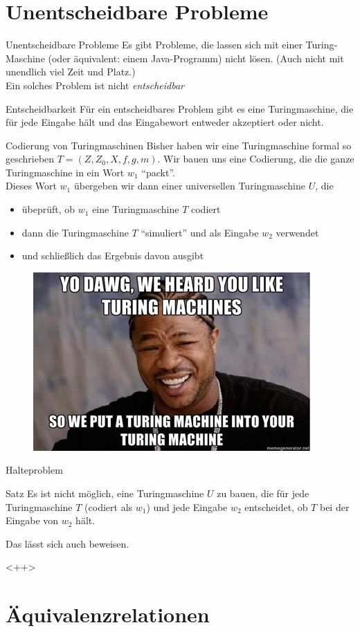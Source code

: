 \section{Unentscheidbare Probleme}
\begin{frame}{Unentscheidbare Probleme}
    Es gibt Probleme, die lassen sich mit einer Turing-Maschine (oder äquivalent: einem Java-Programm) nicht lösen. (Auch nicht mit unendlich viel Zeit und Platz.)\\
    Ein solches Problem ist nicht \emph{entscheidbar}
    \begin{block}{Entscheidbarkeit}
        Für ein entscheidbares Problem gibt es eine Turingmaschine, die für jede Eingabe hält und das Eingabewort entweder akzeptiert oder nicht.
    \end{block}
\end{frame}
\begin{frame}{Codierung von Turingmaschinen}
   Bisher haben wir eine Turingmaschine formal so geschrieben $T = \left( Z, Z_0, X, f, g, m \right)$. Wir bauen uns eine Codierung, die die ganze Turingmaschine in ein Wort $w_1$ ``packt''. \\
   Dieses Wort $w_1$ übergeben wir dann einer universellen Turingmaschine $U$, die 
   \begin{itemize}
       \item übeprüft, ob $w_1$ eine Turingmaschine $T$ codiert
       \item dann die Turingmaschine $T$ ``simuliert'' und als Eingabe $w_2$ verwendet
       \item und schließlich das Ergebnis davon ausgibt
   \end{itemize}
   \begin{figure}[h]
       \centering
       \includegraphics[scale=.5]{graphics/13/33928220.jpg}
   \end{figure}
\end{frame}
\begin{frame}{Halteproblem}
    \begin{block}{Satz}
        Es ist nicht möglich, eine Turingmaschine $U$ zu bauen, die für jede Turingmaschine $T$ (codiert als $w_1$) und jede Eingabe $w_2$  entscheidet, ob $T$ bei der Eingabe von $w_2$ hält.
    \end{block}
    Das lässt sich auch beweisen.
\end{frame}<++>
\section{Äquivalenzrelationen}

